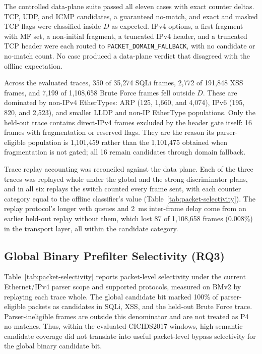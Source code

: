 \documentclass{article}
\begin{document}
The controlled data-plane suite passed all eleven cases with exact counter
deltas. TCP, UDP, and ICMP candidates, a guaranteed no-match, and exact and
masked TCP flags were classified inside $D$ as expected. IPv4 options, a
first fragment with MF set, a non-initial fragment, a truncated IPv4 header,
and a truncated TCP header were each routed to
\texttt{PACKET\_DOMAIN\_FALLBACK}, with no candidate or no-match count. No
case produced a data-plane verdict that disagreed with the offline
expectation.

Across the evaluated traces, 350 of 35,274 SQLi frames, 2,772 of 191,848 XSS
frames, and 7,199 of 1,108,658 Brute Force frames fell outside $D$. These
are dominated by non-IPv4 EtherTypes: ARP (125, 1,660, and 4,074), IPv6
(195, 820, and 2,523), and smaller LLDP and non-IP EtherType populations.
Only the held-out trace contains direct-IPv4 frames excluded by
the header gate itself: 16 frames with fragmentation or reserved flags. They
are the reason its parser-eligible population is 1,101,459 rather than the
1,101,475 obtained when fragmentation is not gated; all 16 remain candidates
through domain fallback.

Trace replay accounting was reconciled against the data plane. Each of the
three traces was replayed whole under the global and the
strong-discriminator plans, and in all six replays the switch counted every
frame sent, with each counter category equal to the offline classifier's
value (Table~\ref{tab:packet-selectivity}). The replay protocol's longer
veth queues and 2~ms inter-frame delay come from an earlier held-out replay
without them, which lost 87 of 1,108,658 frames (0.008\%) in the transport
layer, all within the candidate category.

\subsection{Global Binary Prefilter Selectivity (RQ3)}
Table~\ref{tab:packet-selectivity} reports packet-level selectivity under
the current Ethernet/IPv4 parser scope and supported protocols, measured on
BMv2 by replaying each trace whole. The global candidate bit marked 100\% of
parser-eligible packets as candidates in SQLi, XSS, and the held-out Brute
Force trace. Parser-ineligible frames are outside this denominator and are
not treated as P4 no-matches. Thus, within the evaluated CICIDS2017 windows,
high semantic candidate coverage did not translate into useful packet-level
bypass selectivity for the global binary candidate bit.
\end{document}
